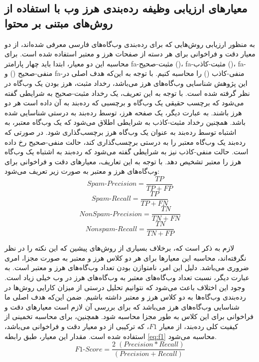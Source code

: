 \documentclass[twoside, a4paper,11pt]{book}
\numberwithin{equation}{chapter}
\numberwithin{table}{chapter}
\numberwithin{figure}{chapter}
\numberwithin{equation}{chapter}
\newcommand{\mls}[1]{\gls{fa-#1}\glsuseri{la-#1}}
\begin{document}
\subsection{معیارهای ارزیابی وظیفه رده‌بندی هرز وب با استفاده از روش‌های مبتنی بر محتوا}
\label{subsection:experiments-measures-content}
به منظور ارزیابی روش‌هایی که برای رده‌بندی وب‌گاه‌های فارسی معرفی شده‌اند، از دو معیار دقت و فراخوانی برای هر دسته از صفحات هرز و معتبر استفاده شده است. برای محاسبه این دو معیار، ابتدا باید چهار پارامتر \mls{مثبت-صحیح} ()، \mls{مثبت-کاذب} ()، \mls{منفی-صحیح} () و \mls{منفی-کاذب} () را محاسبه کنیم. با توجه به این‌که هدف اصلی در این پژوهش شناسایی وب‌گاه‌های هرز می‌باشد، رخداد مثبت، هرز بودن یک وب‌گاه در نظر گرفته شده است. با توجه به این تعریف، یک رخداد مثبت-صحیح به شرایطی گفته می‌شود که برچسب حقیقی یک وب‌گاه و برچسبی که رده‌بند به آن داده است هر دو هرز باشند. به عبارت دیگر، یک صفحه‌ هرز، توسط رده‌بند به درستی شناسایی شده باشد. همچنین رخداد مثبت-کاذب به شرایطی اطلاق می‌شود که یک وب‌گاه معتبر، به اشتباه توسط رده‌بند به عنوان یک وب‌گاه هرز برچسب‌گذاری شود. در صورتی که رده‌بند یک وب‌گاه معتبر را به درستی برچسب‌گذاری کند، حالت منفی-صحیح رخ داده است. حالت منفی-کاذب نیز به شرایطی گفته می‌شود که رده‌بند به اشتباه یک وب‌گاه هرز را معتبر تشخیص دهد. با توجه به این تعاریف، معیارهای دقت و فراخوانی برای وب‌گاه‌های هرز و معتبر به صورت زیر تعریف می‌شود:
  \begin{equation}
  	Spam\text{-}Precision = \frac{TP}{TP + FP}
    \label{eq:sPrecission}
  \end{equation} 
  \begin{equation}
  	Spam\text{-}Recall = \frac{TP}{TP + FN}
    \label{eq:sRecall}
  \end{equation}
  \begin{equation}
  	NonSpam\text{-}Precision = \frac{TN}{TN + FN}
    \label{eq:nsPrecission}
  \end{equation} 
  \begin{equation}
  	Nonspam\text{-}Recall = \frac{TN}{TN + FP}
    \label{eq:nsRecall}
  \end{equation}
 
لازم به ذکر است که، برخلاف بسیاری از روش‌‌های پیشین که این نکته را در نظر نگرفته‌اند، محاسبه این معیارها برای هر دو کلاس هرز و معتبر به صورت مجزا، امری ضروری می‌باشد. دلیل این امر، نامتوازن بودن تعداد وب‌گاه‌های هرز و معتبر است. به عبارت دیگر، نسبت تعداد وب‌گاه‌های معتبر به وب‌گاه‌های هرز در وب خیلی زیاد است. وجود این اختلاف باعث می‌شود که نتوانیم تحلیل درستی از میزان کارایی روش‌ها در رده‌بندی وب‌گاه‌ها به دو کلاس هرز و معتبر داشته باشیم. ضمن این‌که هدف اصلی ما شناسایی وب‌گاه‌های هرز می‌باشد که برای بررسی آن لازم است معیارهای دقت و فراخوانی برای این کلاس به طور مجزا محاسبه شود. همچنین، برای محاسبه تخمینی از کیفیت کلی رده‌بند، از معیار $F1$، که ترکیبی از دو معیار دقت و فراخوانی می‌باشد، استفاده شده است. مقدار این معیار، طبق رابطه \ref{eq:f1} محاسبه می‌شود.
\begin{equation}
  	F1\text{-}Score = \frac{2\;(Precision* Recall)}{(Precision+Recall)}
    \label{eq:f1}
  \end{equation}
  
\end{document}
